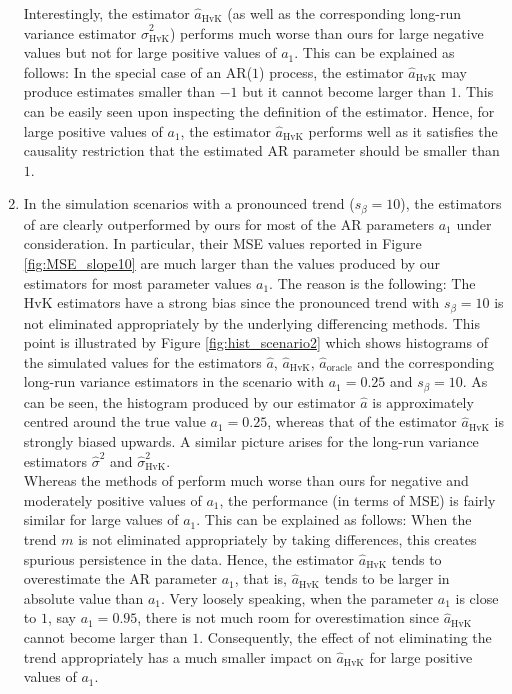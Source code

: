 \begin{enumerate}[label=(\alph*),leftmargin=0.7cm]
Interestingly, the estimator $\widehat{a}_{\text{HvK}}$ (as well as the corresponding long-run variance estimator $\widehat{\sigma}^2_{\text{HvK}}$) performs much worse than ours for large negative values but not for large positive values of $a_1$. This can be explained as follows: In the special case of an AR($1$) process, the estimator $\widehat{a}_{\text{HvK}}$ may produce estimates smaller than $-1$ but it cannot become larger than $1$. This can be easily seen upon inspecting the definition of the estimator. Hence, for large positive values of $a_1$, the estimator $\widehat{a}_{\text{HvK}}$ performs well as it satisfies the causality restriction that the estimated AR parameter should be smaller than $1$. 

\newpage
\item In the simulation scenarios with a pronounced trend ($s_\beta = 10$), the estimators of \cite{Hall2003} are clearly outperformed by ours for most of the AR parameters $a_1$ under consideration. In particular, their MSE values reported in Figure \ref{fig:MSE_slope10} are much larger than the values produced by our estimators for most parameter values $a_1$. The reason is the following: The HvK estimators have a strong bias since the pronounced trend with $s_\beta = 10$ is not eliminated appropriately by the underlying differencing methods. This point is illustrated by Figure \ref{fig:hist_scenario2} which shows histograms of the simulated values for the estimators $\widehat{a}$, $\widehat{a}_{\text{HvK}}$, $\widehat{a}_{\text{oracle}}$ and the corresponding long-run variance estimators in the scenario with $a_1=0.25$ and $s_\beta = 10$. As can be seen, the histogram produced by our estimator $\widehat{a}$ is approximately centred around the true value $a_1 = 0.25$, whereas that of the estimator $\widehat{a}_{\text{HvK}}$ is strongly biased upwards. A similar picture arises for the long-run variance estimators $\widehat{\sigma}^2$ and $\widehat{\sigma}^2_{\text{HvK}}$. \\
Whereas the methods of \cite{Hall2003} perform much worse than ours for negative and moderately positive values of $a_1$, the performance (in terms of MSE) is fairly similar for large values of $a_1$. This can be explained as follows: When the trend $m$ is not eliminated appropriately by taking differences, this creates spurious persistence in the data. Hence, the estimator $\widehat{a}_{\text{HvK}}$ tends to overestimate the AR parameter $a_1$, that is, $\widehat{a}_{\text{HvK}}$ tends to be larger in absolute value than $a_1$. Very loosely speaking, when the parameter $a_1$ is close to $1$, say $a_1 = 0.95$, there is not much room for overestimation since $\widehat{a}_{\text{HvK}}$ cannot become larger than $1$. Consequently, the effect of not eliminating the trend appropriately has a much smaller impact on $\widehat{a}_{\text{HvK}}$ for large positive values of $a_1$. 


\end{enumerate}
